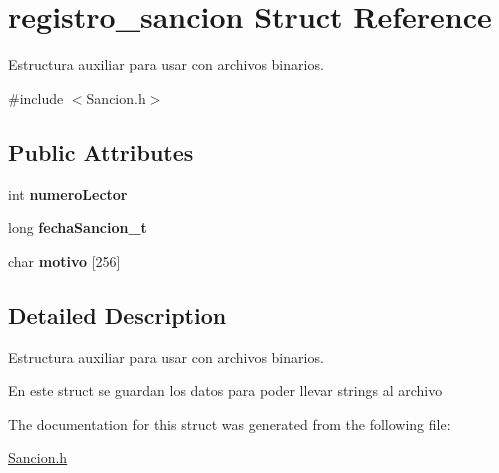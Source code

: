 \hypertarget{structregistro__sancion}{}\section{registro\+\_\+sancion Struct Reference}
\label{structregistro__sancion}


Estructura auxiliar para usar con archivos binarios.  




{\ttfamily \#include $<$Sancion.\+h$>$}

\subsection*{Public Attributes}
\begin{DoxyCompactItemize}
\item 
int {\bfseries numero\+Lector}\hypertarget{structregistro__sancion_ae1f29efe075d22ea7389618475b215a7}{}\label{structregistro__sancion_ae1f29efe075d22ea7389618475b215a7}

\item 
long {\bfseries fecha\+Sancion\+\_\+t}\hypertarget{structregistro__sancion_ac5440b76d468bbfa2008f9aedff53376}{}\label{structregistro__sancion_ac5440b76d468bbfa2008f9aedff53376}

\item 
char {\bfseries motivo} \mbox{[}256\mbox{]}\hypertarget{structregistro__sancion_a8d5afbe87258d4e9ff278b4b1726c74d}{}\label{structregistro__sancion_a8d5afbe87258d4e9ff278b4b1726c74d}

\end{DoxyCompactItemize}


\subsection{Detailed Description}
Estructura auxiliar para usar con archivos binarios. 

En este struct se guardan los datos para poder llevar strings al archivo 

The documentation for this struct was generated from the following file\+:\begin{DoxyCompactItemize}
\item 
\hyperlink{_sancion_8h}{Sancion.\+h}\end{DoxyCompactItemize}
